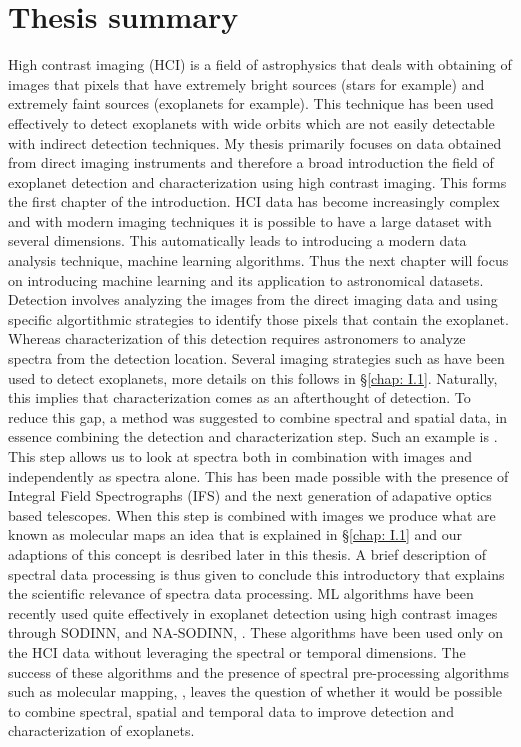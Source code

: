 \chapter*{Thesis summary}
High contrast imaging (HCI) is a field of astrophysics that deals with obtaining of images that pixels that have extremely bright sources (stars for example) and extremely faint sources (exoplanets for example).
This technique has been used effectively to detect exoplanets with wide orbits which are not easily detectable with indirect detection techniques.
My thesis primarily focuses on data obtained from direct imaging instruments and therefore a broad introduction the field of exoplanet detection and characterization\@
using high contrast imaging.
This forms the first chapter of the introduction.
HCI data has become increasingly complex and with modern imaging techniques it is possible to have a large dataset with several dimensions.
This automatically leads to introducing a modern data analysis technique, machine learning algorithms.
Thus the next chapter will focus on introducing machine learning and its application to astronomical datasets.
Detection involves analyzing the images from the direct imaging data and using specific algortithmic strategies to identify those pixels that contain the exoplanet.
Whereas characterization of this detection requires astronomers to analyze spectra from the detection location.
Several imaging strategies such as \citep[ADI, ][]{2006MaroisADI} have been used to detect exoplanets, more details on this follows in 
\S\ref{chap: I.1}.
Naturally, this implies that characterization comes as an afterthought of detection.
To reduce this gap, a method was suggested to combine spectral and spatial data, in essence combining the detection 
and characterization step.
Such an example is \citet[][]{2002SparksSDI}.
This step allows us to look at spectra both in combination with images and independently as spectra alone.
This has been made possible with the presence of Integral Field Spectrographs (IFS) and the next generation of adapative optics based 
telescopes.
When this step is combined with images we produce what are known as molecular maps an idea that is explained in 
\S\ref{chap: I.1} and our adaptions of this concept is desribed later in this thesis.
A brief description of spectral data processing is thus given to conclude this introductory that explains the scientific relevance of spectra data processing.
ML algorithms have been recently used quite effectively in exoplanet detection using high contrast images through SODINN, \citet[][]{2018Gomez}
and NA-SODINN, \citet[][]{2023Carlito}.
These algorithms have been used only on the HCI data without leveraging the spectral or temporal dimensions. 
The success of these algorithms and the presence of spectral pre-processing algorithms such as molecular mapping, \citet[][]{2018AHoeijmakersMM},
leaves the question of whether it would be possible to combine spectral, spatial and temporal data to improve detection and characterization of exoplanets.

